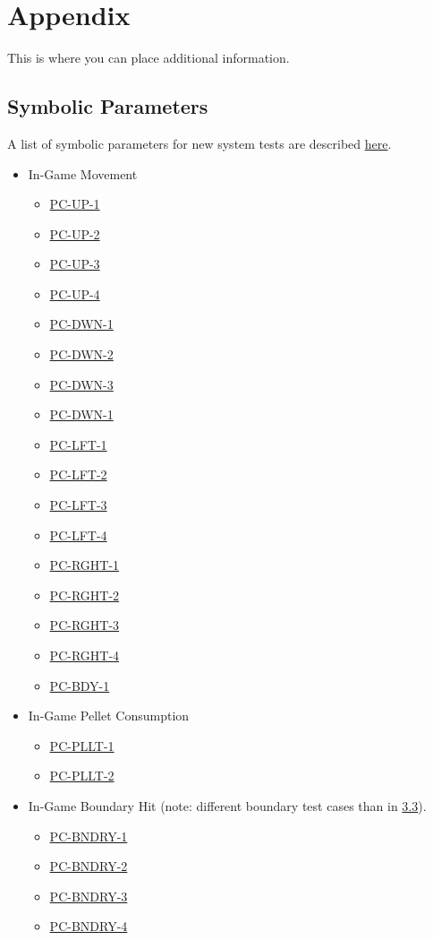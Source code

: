 \documentclass[12pt, titlepage]{article}
\begin{document}
\newpage

\section{Appendix}

This is where you can place additional information.

\subsection{Symbolic Parameters}

A list of symbolic parameters for new system tests are described \hyperref[trace]{here}.

\begin{itemize}
	\item In-Game Movement
	\begin{itemize}
		\item \hyperref[pc-up-1]{PC-UP-1}
		\item \hyperref[pc-up-2]{PC-UP-2}
		\item \hyperref[pc-up-3]{PC-UP-3}
		\item \hyperref[pc-up-4]{PC-UP-4}
		\item \hyperref[pc-dwn-1]{PC-DWN-1}
		\item \hyperref[pc-dwn-2]{PC-DWN-2}
		\item \hyperref[pc-dwn-3]{PC-DWN-3}
		\item \hyperref[pc-dwn-1]{PC-DWN-1}
		\item \hyperref[pc-lft-1]{PC-LFT-1}
		\item \hyperref[pc-lft-2]{PC-LFT-2}
		\item \hyperref[pc-lft-3]{PC-LFT-3}
		\item \hyperref[pc-lft-4]{PC-LFT-4}
		\item \hyperref[pc-rght-1]{PC-RGHT-1}
		\item \hyperref[pc-rght-2]{PC-RGHT-2}
		\item \hyperref[pc-rght-3]{PC-RGHT-3}
		\item \hyperref[pc-rght-4]{PC-RGHT-4}
		\item \hyperref[pc-bdy-1]{PC-BDY-1}
	\end{itemize}
	
	\item In-Game Pellet Consumption
	\begin{itemize}
		\item \hyperref[pc-pllt-1]{PC-PLLT-1}
		\item \hyperref[pc-pllt-2]{PC-PLLT-2}
	\end{itemize}

	\item In-Game Boundary Hit (note: different boundary test cases than in \hyperref[trace]{3.3}).
	\begin{itemize}
		\item \hyperref[pc-bndry-1]{PC-BNDRY-1}
		\item \hyperref[pc-bndry-2]{PC-BNDRY-2}
		\item \hyperref[pc-bndry-3]{PC-BNDRY-3}
		\item \hyperref[pc-bndry-4]{PC-BNDRY-4}
	\end{itemize}
\end{itemize}
\end{document}
